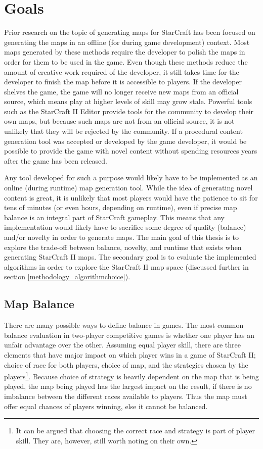 \chapter{Goals}
\label{goals}
Prior research on the topic of generating maps for StarCraft has been focused on generating the maps in an offline (for during game development) context. Most maps generated by these methods require the developer to polish the maps in order for them to be used in the game. Even though these methods reduce the amount of creative work required of the developer, it still takes time for the developer to finish the map before it is accessible to players. If the developer shelves the game, the game will no longer receive new maps from an official source, which means play at higher levels of skill may grow stale. Powerful tools such as the StarCraft II Editor provide tools for the community to develop their own maps, but because such maps are not from an official source, it is not unlikely that they will be rejected by the community. If a procedural content generation tool was accepted or developed by the game developer, it would be possible to provide the game with novel content without spending resources years after the game has been released.

Any tool developed for such a purpose would likely have to be implemented as an online (during runtime) map generation tool. While the idea of generating novel content is great, it is unlikely that most players would have the patience to sit for tens of minutes (or even hours, depending on runtime), even if precise map balance is an integral part of StarCraft gameplay. This means that any implementation would likely have to sacrifice some degree of quality (balance) and/or novelty in order to generate maps. The main goal of this thesis is to explore the trade-off between balance, novelty, and runtime that exists when generating StarCraft II maps. The secondary goal is to evaluate the implemented algorithms in order to explore the StarCraft II map space (discussed further in section \ref{methodology_algorithmchoice}).

\section{Map Balance}
\label{goals_balance}
There are many possible ways to define balance in games. The most common balance evaluation in two-player competitive games is whether one player has an unfair advantage over the other. Assuming equal player skill, there are three elements that have major impact on which player wins in a game of StarCraft II; choice of race for both players, choice of map, and the strategies chosen by the players\footnote{It can be argued that choosing the correct race and strategy is part of player skill. They are, however, still worth noting on their own.}. Because choice of strategy is heavily dependent on the map that is being played, the map being played has the largest impact on the result, if there is no imbalance between the different races available to players. Thus the map must offer equal chances of players winning, else it cannot be balanced.

